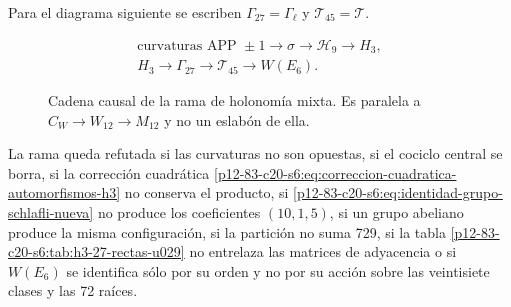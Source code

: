 Para el diagrama siguiente se escriben
\(\Gamma_{27}=\Gamma_\ell\) y \(\mathcal T_{45}=\mathcal T\).
\begin{figure}[htbp]
\centering
\[
 \begin{gathered}
 \text{curvaturas APP }\pm1
 \longrightarrow\sigma
 \longrightarrow\mathcal H_9
 \longrightarrow H_3,\\[3pt]
 H_3
 \longrightarrow\Gamma_{27}
 \longrightarrow\mathcal T_{45}
 \longrightarrow W(E_6).
 \end{gathered}
\]
\caption{Cadena causal de la rama de holonomía mixta. Es paralela a
\(C_W\to W_{12}\to M_{12}\) y no un eslabón de ella.}
\label{p12-83-c20-s6:fig:cadena-holonomia-e6-u029}
\end{figure}

\begin{criterion}
\label{p12-83-c20-s6:crit:refutacion-rama-e6-u029}
La rama queda refutada si las curvaturas no son opuestas, si el cociclo
central se borra, si la corrección cuadrática
\eqref{p12-83-c20-s6:eq:correccion-cuadratica-automorfismos-h3} no conserva el producto,
si \eqref{p12-83-c20-s6:eq:identidad-grupo-schlafli-nueva} no produce los coeficientes
\((10,1,5)\), si un grupo abeliano produce la misma configuración, si la
partición no suma 729, si la tabla
\ref{p12-83-c20-s6:tab:h3-27-rectas-u029} no entrelaza las matrices de adyacencia o si
\(W(E_6)\) se identifica sólo por su orden y no por su acción sobre las
veintisiete clases y las 72 raíces.
\end{criterion}
